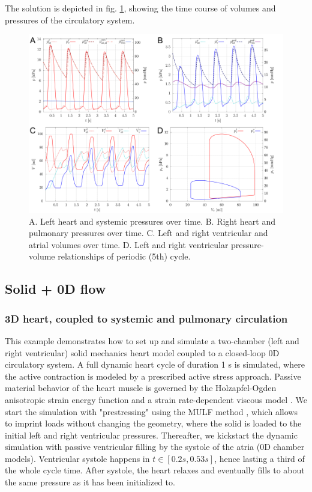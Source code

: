 \documentclass[a4paper,12pt]{report}
\begin{document}
The solution is depicted in fig. \ref{fig:syspul_results}, showing the time course of volumes and pressures of the circulatory system.

\begin{figure}
\centering
\includegraphics[width=1.0\columnwidth]{fig/syspul_results}
\caption{A. Left heart and systemic pressures over time. B. Right heart and pulmonary pressures over time. C. Left and right ventricular and atrial volumes over time. D. Left and right ventricular pressure-volume relationships of periodic (5th) cycle.}
\label{fig:syspul_results}
\end{figure}


\subsection{Solid + 0D flow}\label{subsec:demos:solid_flow0d}

\subsubsection*{3D heart, coupled to systemic and pulmonary circulation}

This example demonstrates how to set up and simulate a two-chamber (left and right ventricular) solid mechanics heart model coupled to a closed-loop
0D circulatory system. A full dynamic heart cycle of duration 1 s is simulated, where the active contraction is modeled by a prescribed active stress approach.
Passive material behavior of the heart muscle is governed by the Holzapfel-Ogden anisotropic strain energy function \cite{holzapfel2009} and a strain rate-dependent viscous model \cite{chapelle2012}.
We start the simulation with "prestressing" using the MULF method \cite{gee2010,schein2021}, which allows to imprint loads without changing the geometry,
where the solid is loaded to the initial left and right ventricular pressures.
Thereafter, we kickstart the dynamic simulation with passive ventricular filling by the systole of the atria (0D chamber models). Ventricular systole
happens in $t \in [0.2 s, 0.53 s]$, hence lasting a third of the whole cycle time. After systole, the heart relaxes and eventually fills to about the same pressure
as it has been initialized to.\\
\end{document}
